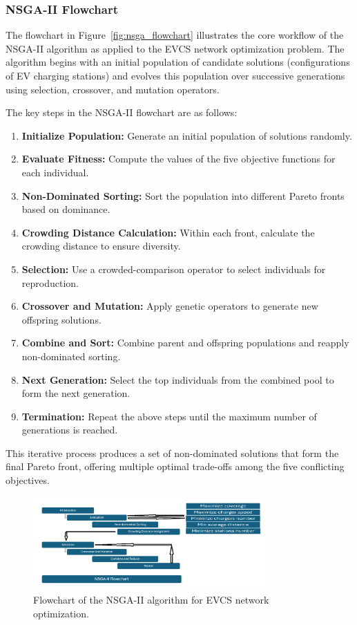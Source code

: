 \subsubsection{NSGA-II Flowchart}

The flowchart in Figure~\ref{fig:nsga_flowchart} illustrates the core workflow of the NSGA-II algorithm as applied to the EVCS network optimization problem. The algorithm begins with an initial population of candidate solutions (configurations of EV charging stations) and evolves this population over successive generations using selection, crossover, and mutation operators.

The key steps in the NSGA-II flowchart are as follows:

\begin{enumerate}
    \item \textbf{Initialize Population:} Generate an initial population of solutions randomly.
    \item \textbf{Evaluate Fitness:} Compute the values of the five objective functions for each individual.
    \item \textbf{Non-Dominated Sorting:} Sort the population into different Pareto fronts based on dominance.
    \item \textbf{Crowding Distance Calculation:} Within each front, calculate the crowding distance to ensure diversity.
    \item \textbf{Selection:} Use a crowded-comparison operator to select individuals for reproduction.
    \item \textbf{Crossover and Mutation:} Apply genetic operators to generate new offspring solutions.
    \item \textbf{Combine and Sort:} Combine parent and offspring populations and reapply non-dominated sorting.
    \item \textbf{Next Generation:} Select the top individuals from the combined pool to form the next generation.
    \item \textbf{Termination:} Repeat the above steps until the maximum number of generations is reached.
\end{enumerate}

This iterative process produces a set of non-dominated solutions that form the final Pareto front, offering multiple optimal trade-offs among the five conflicting objectives.

\begin{figure}[h]
    \centering
    \includegraphics[width=0.8\textwidth]{../Figures/evcs-nsga-flowchart.png}
    \caption{Flowchart of the NSGA-II algorithm for EVCS network optimization.}
    \label{fig:evcs_nsga_flowchart}
\end{figure}


